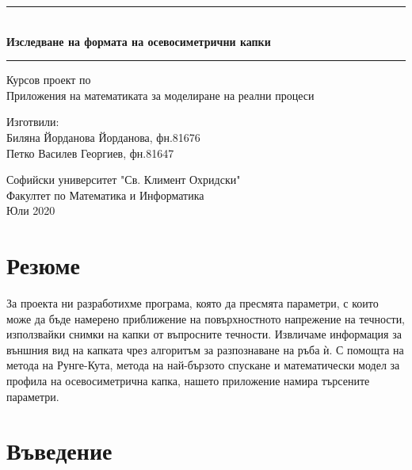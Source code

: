 \documentclass{article}
\newcommand{\HRule}[1]{\rule{\linewidth}{#1}}
\begin{document}
\pagestyle{fancy}
\fancyhf{}
\setlength\headheight{30pt}
\fancyfoot[R]{\thepage}

\begin{titlepage}
    \begin{center}
    \fontsize {50pt}{50pt}
    \HRule{1pt} \\ [1.0cm]
        \textbf{Изследване на формата на осевосиметрични капки}
        \\ [1cm]
    \HRule{1pt}
        \vspace{1cm}
        
        \Huge
        Курсов проект по \\ Приложения на математиката за моделиране на реални процеси\\
        \vspace{3cm}
        
        \Large
        Изготвили:\\ Биляна Йорданова Йорданова, фн.81676\\
        Петко Василев Георгиев, фн.81647
        
        \vfill
        \vspace{1cm}
        Софийски университет "Св. Климент Охридски"\\
        Факултет по Математика и Информатика\\
        
        Юли 2020
    \end{center}
\end{titlepage}

\tableofcontents
\newpage

\section{Резюме}
За проекта ни разработихме програма, която да пресмята параметри, с които може да бъде намерено приближение на повърхностното напрежение на течности, използвайки снимки на капки от въпросните течности. Извличаме информация за външния вид на капката чрез алгоритъм за разпознаване на ръба ѝ.
С помощта на метода на Рунге-Кута, метода на най-бързото спускане и математически модел за профила на осевосиметрична капка, нашето приложение намира търсените параметри.

\section{Въведение}
\end{document}

